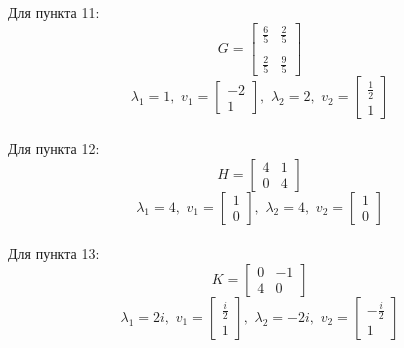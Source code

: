 \documentclass[a5paper, 10pt]{article}
\theoremstyle{definition}
\theoremstyle{plain}
\theoremstyle{remark}
\begin{document}
Для пункта 11:
\begin{equation}
G =
\begin{bmatrix}
\frac{6}{5} & \frac{2}{5}\\
\\
\frac{2}{5} & \frac{9}{5}
\end{bmatrix}
\end{equation}
\begin{equation}
\lambda_1 = 1, \, \,
v_1 =
\begin{bmatrix}
-2\\
1
\end{bmatrix}
, \, \,
\lambda_2 =  2, \, \,
v_2 =
\begin{bmatrix}
\frac{1}{2}\\
1
\end{bmatrix}
\end{equation}
\\

Для пункта 12:
\begin{equation}
H =
\begin{bmatrix}
4 & 1\\
0 & 4
\end{bmatrix}
\end{equation}
\begin{equation}
\lambda_1 = 4, \, \,
v_1 =
\begin{bmatrix}
1\\
0
\end{bmatrix}
, \, \,
\lambda_2 =  4, \, \,
v_2 =
\begin{bmatrix}
1\\
0
\end{bmatrix}
\end{equation}
\\

Для пункта 13:
\begin{equation}
K =
\begin{bmatrix}
0 & -1\\
4 & 0
\end{bmatrix}
\end{equation}
\begin{equation}
\lambda_1 = 2i, \, \,
v_1 =
\begin{bmatrix}
\frac{i}{2}\\
1
\end{bmatrix}
, \, \,
\lambda_2 =  -2i, \, \,
v_2 =
\begin{bmatrix}
-\frac{i}{2}\\
1
\end{bmatrix}
\end{equation}
\\
\end{document}
